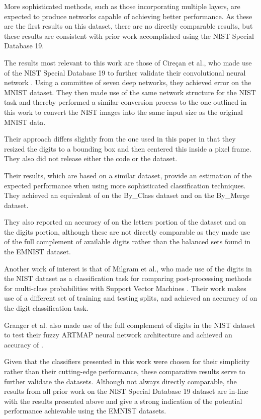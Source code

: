 \documentclass[conference]{IEEEtran}
\begin{document}
More sophisticated methods, such as those incorporating multiple layers, are expected to produce networks capable of achieving better performance. As these are the first results on this dataset, there are no directly comparable results, but these results are consistent with prior work accomplished using the NIST Special Database 19.

The results most relevant to this work are those of Cire\c{c}an et al., who made use of the NIST Special Database 19 to further validate their convolutional neural network \cite{Ciresan2011}. Using a committee of seven deep networks, they achieved  error on the MNIST dataset. They then made use of the same network structure for the NIST task and thereby performed a similar conversion process to the one outlined in this work to convert the NIST images into the same input size as the original MNIST data. 

Their approach differs slightly from the one used in this paper in that they resized the digits to a  bounding box and then centered this inside a  pixel frame. They also did not release either the code or the dataset. 

Their results, which are based on a similar dataset, provide an estimation of the expected performance when using more sophisticated classification techniques. They achieved an equivalent of  on the By\_Class dataset and  on the By\_Merge dataset. 

They also reported an accuracy of  on the letters portion of the dataset and  on the digits portion, although these are not directly comparable as they made use of the full complement of available digits rather than the balanced sets found in the EMNIST dataset.

Another work of interest is that of Milgram et al., who made use of the digits in the NIST dataset as a classification task for comparing post-processing methods for multi-class probabilities with Support Vector Machines \cite{Milgram2005}. Their work makes use of a different set of training and testing splits, and achieved an accuracy of  on the digit classification task. 

Granger et al. also made use of the full complement of digits in the NIST dataset to test their fuzzy ARTMAP neural network architecture \cite{Granger2007} and achieved an accuracy of . 

Given that the classifiers presented in this work were chosen for their simplicity rather than their cutting-edge performance, these comparative results serve to further validate the datasets. Although not always directly comparable, the results from all prior work on the NIST Special Database 19 dataset are in-line with the results presented above and give a strong indication of the potential performance achievable using the EMNIST datasets.
\end{document}
